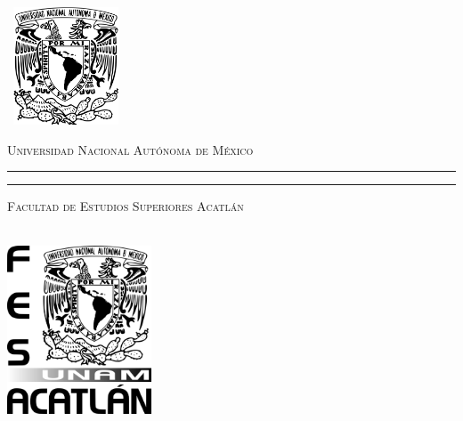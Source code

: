 \documentclass[
    fontsize=11pt,
    a4paper
   ]{scrbook}
\begin{document}
    \begin{titlepage}
        \thispagestyle{empty}
        \begin{minipage}[c][0.17\textheight][c]{0.25\textwidth}
            \begin{center}
                \includegraphics[width=3.5cm, height=3.5cm]{media/EscudoUNAM.png}
            \end{center}
        \end{minipage}
        \begin{minipage}[c][0.17\textheight][t]{0.65\textwidth}
            \begin{center}
                \vspace{.3cm}
                \textsc{\large Universidad Nacional Aut\'onoma de M\'exico}\\[0.5cm]
                \vspace{.3cm}
                \hrule height2.5pt
                \vspace{.1cm}
                \hrule height1pt
                \vspace{.8cm}
                \textsc{\LARGE Facultad de Estudios Superiores Acatlán}\\[0.5cm] %
            \end{center}
        \end{minipage}

        \begin{minipage}[c][0.81\textheight][t]{0.25\textwidth}
            \vspace*{5mm}
            \begin{center}
                \hskip2pt
                \vrule width2.5pt height13cm
                \hskip1mm
                \vrule width1pt height13cm \\
                \includegraphics[height=5cm]{media/EscudoFESAcatlan.jpg}
            \end{center}
        \end{minipage}
        \begin{minipage}[c][0.81\textheight][t]{0.65\textwidth}
            \begin{center}
                \vspace{1cm}


\end{center}
\end{minipage}
\end{titlepage}
\end{document}
